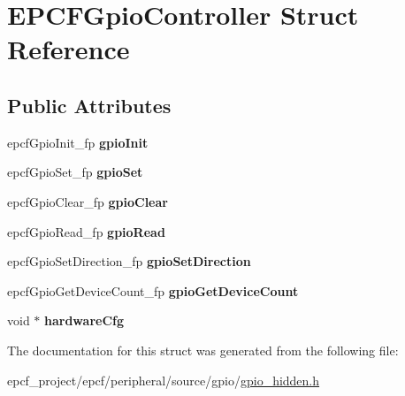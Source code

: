 \hypertarget{structEPCFGpioController}{}\section{E\+P\+C\+F\+Gpio\+Controller Struct Reference}
\label{structEPCFGpioController}
\subsection*{Public Attributes}
\begin{DoxyCompactItemize}
\item 
\mbox{\label{structEPCFGpioController_a60d608bdbada257dfc4d74e91f6281a4}} 
epcf\+Gpio\+Init\+\_\+fp {\bfseries gpio\+Init}
\item 
\mbox{\label{structEPCFGpioController_a85a9eebd8d352f8e03d6835bc9eca81e}} 
epcf\+Gpio\+Set\+\_\+fp {\bfseries gpio\+Set}
\item 
\mbox{\label{structEPCFGpioController_a397a7b22ae8d10cc03fefc2d3017fbc3}} 
epcf\+Gpio\+Clear\+\_\+fp {\bfseries gpio\+Clear}
\item 
\mbox{\label{structEPCFGpioController_abf4fab76a60242531b445731fe2995ba}} 
epcf\+Gpio\+Read\+\_\+fp {\bfseries gpio\+Read}
\item 
\mbox{\label{structEPCFGpioController_a218cc0521ffe5974c44a3ff6e912bb67}} 
epcf\+Gpio\+Set\+Direction\+\_\+fp {\bfseries gpio\+Set\+Direction}
\item 
\mbox{\label{structEPCFGpioController_a13a8f0daf9e2b2f6041aaaa011404383}} 
epcf\+Gpio\+Get\+Device\+Count\+\_\+fp {\bfseries gpio\+Get\+Device\+Count}
\item 
\mbox{\label{structEPCFGpioController_af66a29159ce028043bec3efe558d3876}} 
void $\ast$ {\bfseries hardware\+Cfg}
\end{DoxyCompactItemize}


The documentation for this struct was generated from the following file\+:\begin{DoxyCompactItemize}
\item 
epcf\+\_\+project/epcf/peripheral/source/gpio/\mbox{\hyperlink{gpio__hidden_8h}{gpio\+\_\+hidden.\+h}}\end{DoxyCompactItemize}
